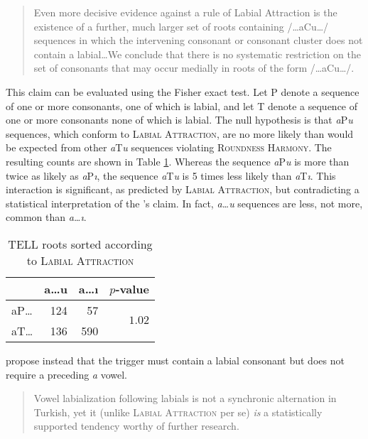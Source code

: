 \begin{quote}
Even more decisive evidence against a rule of Labial Attraction is the existence of a further, much larger set of roots containing /\ldots{}aCu\ldots/ sequences in which the intervening consonant or consonant cluster does not contain a labial\ldots{}We conclude that there is no systematic restriction on the set of consonants that may occur medially in roots of the form /\ldots{}aCu\ldots/. \citep[225]{Clements1982}
\end{quote}

\noindent 
This claim can be evaluated using the Fisher exact test. Let P denote a sequence of one or more consonants, one of which is labial, and let T denote a sequence of one or more consonants none of which is labial. The null hypothesis is that \emph{a}P\emph{u} sequences, which conform to \textsc{Labial Attraction}, are no more likely than would be expected from other \emph{a}T\emph{u} sequences violating \textsc{Roundness Harmony}. The resulting counts are shown in Table \ref{las}. Whereas the sequence \emph{a}P\emph{u} is more than twice as likely as \emph{a}P\emph{ı}, the sequence \emph{a}T\emph{u} is 5 times less likely than \emph{a}T\emph{ı}. This interaction is significant, as predicted by \textsc{Labial Attraction}, but contradicting a statistical interpretation of the \citeauthor{Clements1982}'s claim. In fact, \emph{a\ldots{}u} sequences are less, not more, common than \emph{a\ldots{}ı}.

\begin{table}
\centering
\begin{tabular}{lrrr}
\toprule
       & a\ldots{}u & a\ldots{}ı & $p$-value                      \\
\midrule
aP\ldots{} & 124    & 57     & \multirow{2}{*}{$1.02$\e{-36}} \\
aT\ldots{} & 136    & 590    &                                \\
\bottomrule
\end{tabular}
\caption{TELL roots sorted according to \textsc{Labial Attraction}}
\label{las}
\end{table}

\noindent
\citet[196]{Inkelas2001} propose instead that the trigger must contain a labial consonant but does not require a preceding \emph{a} vowel.

\begin{quote}
Vowel labialization following labials is not a synchronic alternation in Turkish, yet it (unlike \textsc{Labial Attraction} per se) \emph{is} a statistically supported tendency worthy of further research. \citep[][196]{Inkelas2001}
\end{quote}

